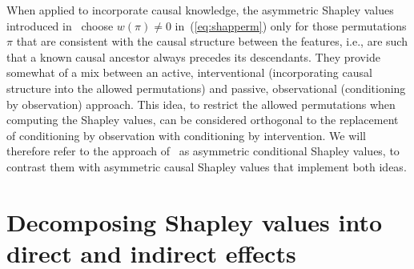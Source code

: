 \documentclass{article}
\newcommand{\vX}{\mathbf{X}}
\newcommand{\perm}{\pi}
\newcommand{\comment}[1]{{\color{red} #1}}
\begin{document}


When applied to incorporate causal knowledge, the asymmetric Shapley values introduced in~\cite{frye2019asymmetric} choose $w(\perm) \neq 0$ in~(\ref{eq:shapperm}) only for those permutations $\perm$ that are consistent with the causal structure between the features, i.e., are such that a known causal ancestor always precedes its descendants. They provide somewhat of a mix between an active, interventional (incorporating causal structure into the allowed permutations) and passive, observational (conditioning by observation) approach. This idea, to restrict the allowed permutations when computing the Shapley values, can be considered orthogonal to the replacement of conditioning by observation with conditioning by intervention. We will therefore refer to the approach of~\cite{frye2019asymmetric} as asymmetric conditional Shapley values, to contrast them with asymmetric causal Shapley values that implement both ideas.

\section{Decomposing Shapley values into direct and indirect effects}
\end{document}
